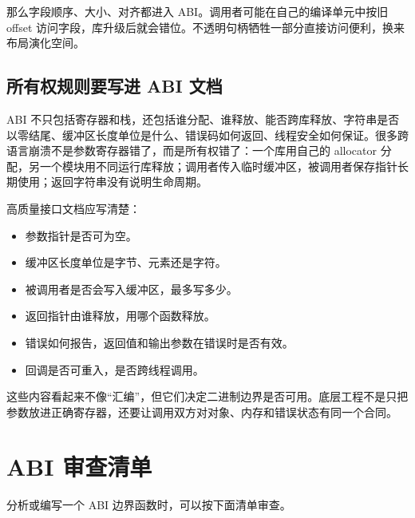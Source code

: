 那么字段顺序、大小、对齐都进入 ABI。调用者可能在自己的编译单元中按旧 offset 访问字段，库升级后就会错位。不透明句柄牺牲一部分直接访问便利，换来布局演化空间。

\subsection{所有权规则要写进 ABI 文档}

ABI 不只包括寄存器和栈，还包括谁分配、谁释放、能否跨库释放、字符串是否以零结尾、缓冲区长度单位是什么、错误码如何返回、线程安全如何保证。很多跨语言崩溃不是参数寄存器错了，而是所有权错了：一个库用自己的 allocator 分配，另一个模块用不同运行库释放；调用者传入临时缓冲区，被调用者保存指针长期使用；返回字符串没有说明生命周期。

高质量接口文档应写清楚：

\begin{itemize}
  \item 参数指针是否可为空。
  \item 缓冲区长度单位是字节、元素还是字符。
  \item 被调用者是否会写入缓冲区，最多写多少。
  \item 返回指针由谁释放，用哪个函数释放。
  \item 错误如何报告，返回值和输出参数在错误时是否有效。
  \item 回调是否可重入，是否跨线程调用。
\end{itemize}

这些内容看起来不像“汇编”，但它们决定二进制边界是否可用。底层工程不是只把参数放进正确寄存器，还要让调用双方对对象、内存和错误状态有同一个合同。

\section{ABI 审查清单}

分析或编写一个 ABI 边界函数时，可以按下面清单审查。

